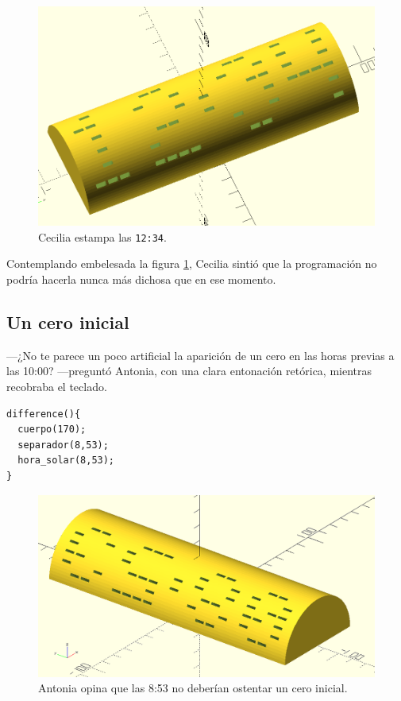 \begin{figure}[ht]
  \centering
  \includegraphics[width=.8\textwidth]{imagenes/12_34}
  \caption{Cecilia estampa las \texttt{12:34}.}
  \label{fig:12_34}
\end{figure}
  

Contemplando embelesada la figura \ref{fig:12_34}, Cecilia sintió que
la programación no podría hacerla nunca más dichosa que en ese
momento.

\subsection{Un cero inicial}

---¿No te parece un poco artificial la aparición de un cero en las
horas previas a las 10:00? ---preguntó Antonia, con una clara
entonación retórica, mientras recobraba el teclado.

\begin{lstlisting}
difference(){
  cuerpo(170);
  separador(8,53);
  hora_solar(8,53);
}
\end{lstlisting}%

\begin{figure}[ht]
  \centering
  \includegraphics[width=.75\textwidth]{imagenes/08_53}
  \caption{Antonia opina que las 8:53 no deberían ostentar un cero
    inicial.}
  \label{fig:08_53}
\end{figure}
  

